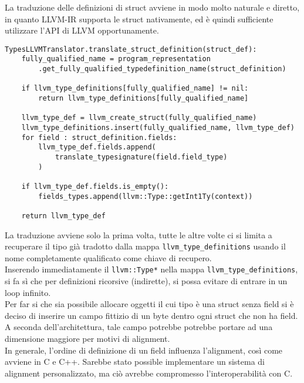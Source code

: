 La traduzione delle definizioni di struct avviene in modo molto naturale e diretto, in quanto LLVM-IR supporta le struct nativamente, 
ed è quindi sufficiente utilizzare l'API di LLVM opportunamente.

\vspace{0.5cm}
\begin{lstlisting}[frame=single]
TypesLLVMTranslator.translate_struct_definition(struct_def):
    fully_qualified_name = program_representation
        .get_fully_qualified_typedefinition_name(struct_definition)

    if llvm_type_definitions[fully_qualified_name] != nil:
        return llvm_type_definitions[fully_qualified_name]
    
    llvm_type_def = llvm_create_struct(fully_qualified_name)
    llvm_type_definitions.insert(fully_qualified_name, llvm_type_def)
    for field : struct_definition.fields:
        llvm_type_def.fields.append(
            translate_typesignature(field.field_type)
        )
    
    if llvm_type_def.fields.is_empty():
        fields_types.append(llvm::Type::getInt1Ty(context))
    
    return llvm_type_def
\end{lstlisting}
\vspace{0.5cm}

La traduzione avviene solo la prima volta, tutte le altre volte ci si limita a recuperare 
il tipo già tradotto dalla mappa \texttt{llvm\_type\_definitions} usando il nome completamente qualificato come 
chiave di recupero. \\

Inserendo immediatamente il \texttt{llvm::Type*} nella mappa \texttt{llvm\_type\_definitions}, 
si fa sì che per definizioni ricorsive (indirette), si possa evitare di entrare in un loop infinito. \\

Per far si che sia possibile allocare oggetti il cui tipo è una struct senza field si è deciso di inserire un 
campo fittizio di un byte dentro ogni struct che non ha field. A seconda dell'architettura, tale campo potrebbe
potrebbe portare ad una dimensione maggiore per motivi di alignment. \\

In generale, l'ordine di definizione di un field influenza l'alignment, così come avviene in C e C++. Sarebbe stato 
possible implementare un sistema di alignment personalizzato, ma ciò avrebbe compromesso l'interoperabilità con C. \\

